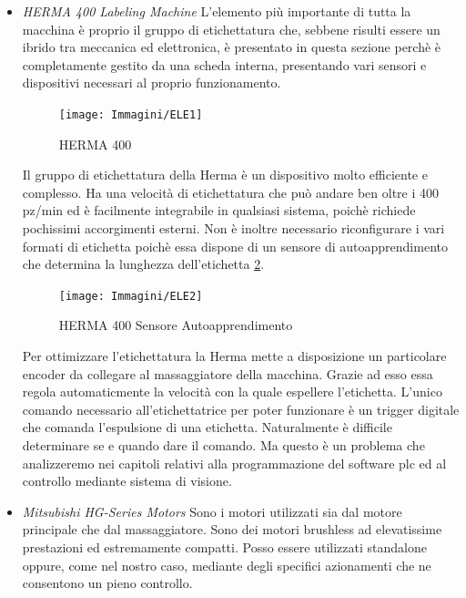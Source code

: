 \documentclass[12pt, a4paper, oneside]{book}
\begin{document}
\begin{itemize}
	
	\item \textit{HERMA 400 Labeling Machine}	
	L'elemento più importante di tutta la macchina è proprio il gruppo di etichettatura che, sebbene risulti essere un ibrido tra meccanica ed elettronica, è presentato in questa sezione perchè è completamente gestito da una scheda interna, presentando vari sensori e dispositivi necessari al proprio funzionamento.
	

	
	\begin{figure}[H]
		\centering
		\texttt{[image: Immagini/ELE1]}
		\label{ele1}
		\caption{HERMA 400}
	\end{figure}
	
	
	Il gruppo di etichettatura della Herma è un dispositivo molto efficiente e complesso. Ha una velocità di etichettatura che può andare ben oltre i 400 pz/min ed è facilmente integrabile in qualsiasi sistema, poichè richiede pochissimi accorgimenti esterni. Non è inoltre necessario riconfigurare i vari formati di etichetta poichè essa dispone di un sensore di autoapprendimento che determina la lunghezza dell'etichetta \ref{ele2}.
	
		\begin{figure}[H]
		\centering
		\texttt{[image: Immagini/ELE2]}
		\label{ele2}
		\caption{HERMA 400 Sensore Autoapprendimento}
	\end{figure}
	
	 Per ottimizzare l'etichettatura la Herma mette a disposizione un particolare encoder da collegare al massaggiatore della macchina. Grazie ad esso essa regola automaticmente la velocità con la quale espellere l'etichetta. L'unico comando necessario all'etichettatrice per poter funzionare è un trigger digitale che comanda l'espulsione di una etichetta. Naturalmente è difficile determinare se e quando dare il comando. Ma questo è un problema che analizzeremo nei capitoli relativi alla programmazione del software plc ed al controllo mediante sistema di visione.  
	
	\item \textit{Mitsubishi HG-Series Motors}
	Sono i motori utilizzati sia dal motore principale che dal massaggiatore. Sono dei motori brushless ad elevatissime prestazioni ed estremamente compatti. Posso essere utilizzati standalone oppure, come nel nostro caso, mediante degli specifici azionamenti che ne consentono un pieno controllo. 
	

\end{itemize}
\end{document}
